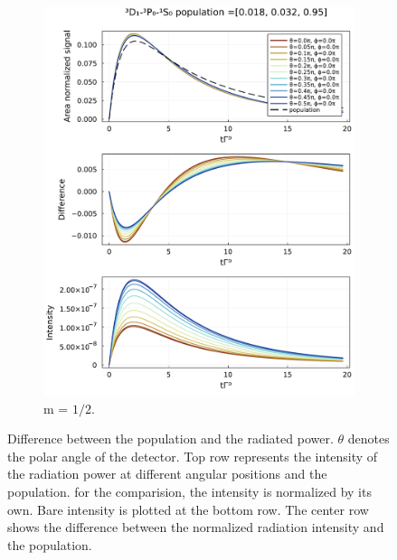 \documentclass{article}
\begin{document}
\begin{figure}
\begin{subfigure}[b]{.49\textwidth}
        \includegraphics[width=\textwidth]{[4]|F_i=2.5,1.5,1.5,0.5|displacement=0.0,0.0,0.0|exc_frac=0.018,0.032|m_exc=0.5.jld2_int-pop.pdf}
        \caption{m = $1/2$.}
    \end{subfigure}
    \caption{\label{fig:pop_rad_diff}Difference between the population and the radiated power. $\theta$ denotes the polar angle of the detector. Top row represents the intensity of the radiation power at different angular positions and the population. for the comparision, the intensity is normalized by its own. Bare intensity is plotted at the bottom row. The center row shows the difference between the normalized radiation intensity and the population.}
\end{figure}
\end{document}
